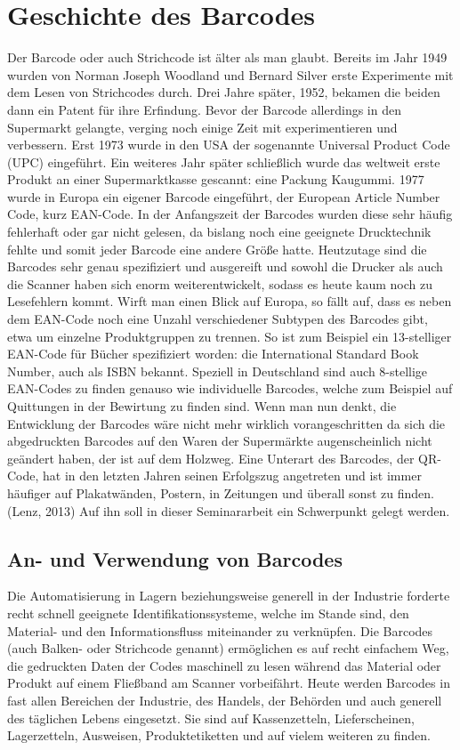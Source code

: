 \section{Geschichte des Barcodes}
Der Barcode oder auch Strichcode ist älter als man glaubt. Bereits im Jahr 1949 wurden von Norman Joseph Woodland und Bernard Silver erste Experimente mit dem Lesen von Strichcodes durch. Drei Jahre später, 1952, bekamen die beiden dann ein Patent für ihre Erfindung. 
Bevor der Barcode allerdings in den Supermarkt gelangte, verging noch einige Zeit mit experimentieren und verbessern. Erst 1973 wurde in den USA der sogenannte Universal Product Code (UPC) eingeführt. Ein weiteres Jahr später schließlich wurde das weltweit erste Produkt an einer Supermarktkasse gescannt: eine Packung Kaugummi.
1977 wurde in Europa ein eigener Barcode eingeführt, der European Article Number Code, kurz EAN-Code. 
In der Anfangszeit der Barcodes wurden diese sehr häufig fehlerhaft oder gar nicht gelesen, da bislang noch eine geeignete Drucktechnik fehlte und somit jeder Barcode eine andere Größe hatte. Heutzutage sind die Barcodes sehr genau spezifiziert und ausgereift und sowohl die Drucker als auch die Scanner haben sich enorm weiterentwickelt, sodass es heute kaum noch zu Lesefehlern kommt.
Wirft man einen Blick auf Europa, so fällt auf, dass es neben dem EAN-Code noch eine Unzahl verschiedener Subtypen des Barcodes gibt, etwa um einzelne Produktgruppen zu trennen. So ist zum Beispiel ein 13-stelliger EAN-Code für Bücher spezifiziert worden: die International Standard Book Number, auch als ISBN bekannt. Speziell in Deutschland sind auch 8-stellige EAN-Codes zu finden genauso wie individuelle Barcodes, welche zum Beispiel auf Quittungen in der Bewirtung zu finden sind.
Wenn man nun denkt, die Entwicklung der Barcodes wäre nicht mehr wirklich vorangeschritten da sich die abgedruckten Barcodes auf den Waren der Supermärkte augenscheinlich nicht geändert haben, der ist auf dem Holzweg. Eine Unterart des Barcodes, der QR-Code, hat in den letzten Jahren seinen Erfolgszug angetreten und ist immer häufiger auf Plakatwänden, Postern, in Zeitungen und überall sonst zu finden. (Lenz, 2013) Auf ihn soll in dieser Seminararbeit ein Schwerpunkt gelegt werden.

\subsection{An- und Verwendung von Barcodes}
Die Automatisierung in Lagern beziehungsweise generell in der Industrie forderte recht schnell geeignete Identifikationssysteme, welche im Stande sind, den Material- und den Informationsfluss miteinander zu verknüpfen. Die Barcodes (auch Balken- oder Strichcode genannt) ermöglichen es auf recht einfachem Weg, die gedruckten Daten der Codes maschinell zu lesen während das Material oder Produkt auf einem Fließband am Scanner vorbeifährt. Heute werden Barcodes in fast allen Bereichen der Industrie, des Handels, der Behörden und auch generell des täglichen Lebens eingesetzt. Sie sind auf Kassenzetteln, Lieferscheinen, Lagerzetteln, Ausweisen, Produktetiketten und auf vielem weiteren zu finden.